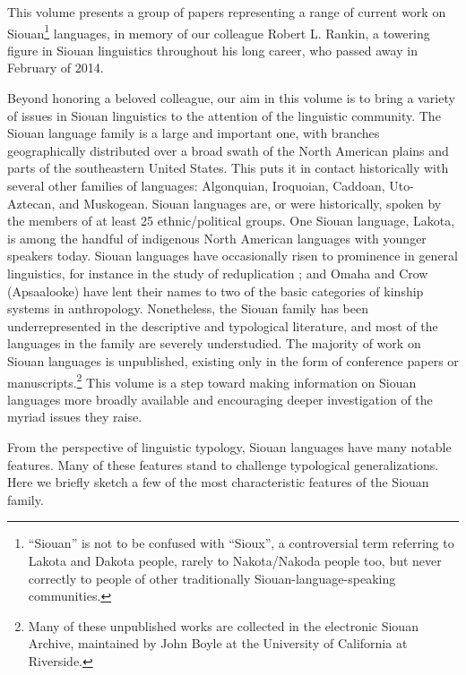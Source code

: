 \begin{refsection}

This volume presents a group of papers representing a range of current work on Siouan\footnote{``Siouan'' is not to be confused with ``Sioux'', a controversial term referring to Lakota and Dakota people, rarely to Nakota/Nakoda people too, but never correctly to people of other traditionally Siouan-language-speaking communities.} languages, in memory of our colleague Robert L. Rankin, a towering figure in Siouan linguistics throughout his long career, who passed away in February of 2014.


Beyond honoring a beloved colleague, our aim in this volume is to bring a variety of issues in Siouan linguistics to the attention of the linguistic community. The Siouan language family is a large and important one, with branches geographically distributed over a broad swath of the North American plains and parts of the southeastern United States. This puts it in contact historically with several other families of languages: Algonquian, Iroquoian, Caddoan, Uto-Aztecan, and Muskogean. Siouan languages are, or were historically, spoken by the members of at least 25 ethnic/political groups. One Siouan language, Lakota, is among the handful of indigenous North American languages with younger speakers today. Siouan languages have occasionally risen to prominence in general linguistics, for instance in the study of reduplication \citep{Shaw1980}; and Omaha and Crow (Apsaalooke) have lent their names to two of the basic categories of kinship systems in anthropology. Nonetheless, the Siouan family has been underrepresented in the descriptive and typological literature, and most of the languages in the family are severely understudied. The majority of work on Siouan languages is unpublished, existing only in the form of conference papers or manuscripts.\footnote{Many of these unpublished works are collected in the electronic Siouan Archive, maintained by John Boyle at the University of California at Riverside.} This volume is a step toward making information on Siouan languages more broadly available and encouraging deeper investigation of the myriad issues they raise.


From the perspective of linguistic typology, Siouan languages have many notable features. Many of these features stand to challenge typological generalizations. Here we briefly sketch a few of the most characteristic features of the Siouan family.



\end{refsection}
